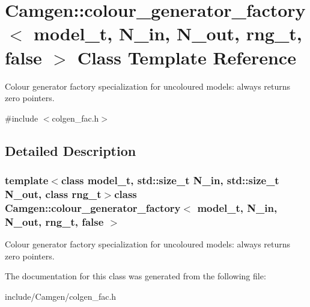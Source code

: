 \hypertarget{a00086}{\section{Camgen\-:\-:colour\-\_\-generator\-\_\-factory$<$ model\-\_\-t, N\-\_\-in, N\-\_\-out, rng\-\_\-t, false $>$ Class Template Reference}
\label{a00086}
}


Colour generator factory specialization for uncoloured models\-: always returns zero pointers.  




{\ttfamily \#include $<$colgen\-\_\-fac.\-h$>$}



\subsection{Detailed Description}
\subsubsection*{template$<$class model\-\_\-t, std\-::size\-\_\-t N\-\_\-in, std\-::size\-\_\-t N\-\_\-out, class rng\-\_\-t$>$class Camgen\-::colour\-\_\-generator\-\_\-factory$<$ model\-\_\-t, N\-\_\-in, N\-\_\-out, rng\-\_\-t, false $>$}

Colour generator factory specialization for uncoloured models\-: always returns zero pointers. 



The documentation for this class was generated from the following file\-:\begin{DoxyCompactItemize}
\item 
include/\-Camgen/colgen\-\_\-fac.\-h\end{DoxyCompactItemize}
